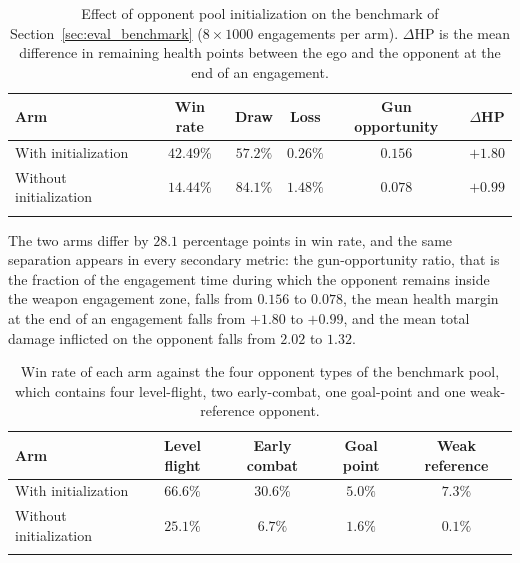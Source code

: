 \begin{table}[h]
\caption{Effect of opponent pool initialization on the benchmark of Section~\ref{sec:eval_benchmark} ($8\times1000$ engagements per arm). $\Delta$HP is the mean difference in remaining health points between the ego and the opponent at the end of an engagement.}
\label{tab:init_ablation_results}
\small
\begin{tabular*}{\textwidth}{@{\extracolsep\fill}lccccc}
\toprule
Arm & Win rate & Draw & Loss & Gun opportunity & $\Delta$HP\\
\midrule
With initialization & $42.49\%$ & $57.2\%$ & $0.26\%$ & $0.156$ & $+1.80$\\
Without initialization & $14.44\%$ & $84.1\%$ & $1.48\%$ & $0.078$ & $+0.99$\\
\botrule
\end{tabular*}
\end{table}

The two arms differ by $28.1$ percentage points in win rate, and the same separation appears in every secondary metric: the gun-opportunity ratio, that is the fraction of the engagement time during which the opponent remains inside the weapon engagement zone, falls from $0.156$ to $0.078$, the mean health margin at the end of an engagement falls from $+1.80$ to $+0.99$, and the mean total damage inflicted on the opponent falls from $2.02$ to $1.32$.

\begin{table}[h]
\caption{Win rate of each arm against the four opponent types of the benchmark pool, which contains four level-flight, two early-combat, one goal-point and one weak-reference opponent.}
\label{tab:init_ablation_bytype}
\small
\begin{tabular*}{\textwidth}{@{\extracolsep\fill}lcccc}
\toprule
Arm & Level flight & Early combat & Goal point & Weak reference\\
\midrule
With initialization & $66.6\%$ & $30.6\%$ & $5.0\%$ & $7.3\%$\\
Without initialization & $25.1\%$ & $6.7\%$ & $1.6\%$ & $0.1\%$\\
\botrule
\end{tabular*}
\end{table}


